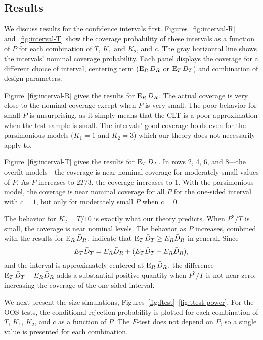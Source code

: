 \documentclass[11pt]{article}
\begin{document}
\subsection{Results}
We discuss results for the confidence intervals first.
Figures~\ref{fig:interval-R} and~\ref{fig:interval-T} show the
coverage probability of these intervals as a function of $P$ for each
combination of $T$, $K_1$ and $K_2$, and $c$.  The gray horizontal
line shows the intervals' nominal coverage probability.  Each panel
displays the coverage for a different choice of interval, centering
term ($\operatorname{E}_R \bar{D}_{R}$ or $\operatorname{E}_T \bar{D}_{T}$) and combination of design
parameters.

Figure~\ref{fig:interval-R} gives the results for $\operatorname{E}_R \bar{D}_{R}$.  The
actual coverage is very close to the nominal coverage except when $P$
is very small.  The poor behavior for small $P$ is unsurprising, as it
simply means that the CLT is a poor approximation when the test
sample is small.  The intervals' good coverage holds even for the
parsimonious models ($K_1=1$ and $K_2= 3$) which our theory does not
necessarily apply to.

Figure~\ref{fig:interval-T} gives the results for $\operatorname{E}_T \bar{D}_{T}$.  In
rows 2, 4, 6, and 8---the overfit models---the coverage is near
nominal coverage for moderately small values of $P$.  As $P$ increases
to $2T/3$, the coverage increases to 1.  With the parsimonious model,
the coverage is near nominal coverage for all $P$ for the one-sided
interval with $c=1$, but only for moderately small $P$ when $c=0$.

The behavior for $K_2 = T/10$ is exactly what our theory predicts.
When $P^2/T$ is small, the coverage is near nominal levels.  The
behavior as $P$ increases, combined with the results for $\operatorname{E}_R
\bar{D}_{R}$, indicate that $\operatorname{E}_T \bar{D}_{T} \geq E_R \bar{D}_{R}$ in general.
Since
\[E_{T} \bar{D}_{T} = E_{R} \bar{D}_{R} + (E_{T} \bar{D}_{T} - E_{R} \bar{D}_{R}), \] and the
interval is approximately centered at $\operatorname{E}_R \bar{D}_{R}$, the difference
$\operatorname{E}_{T} \bar{D}_{T} - E_{R} \bar{D}_{R}$ adds a substantial positive quantity when
$P^2/T$ is not near zero, increasing the coverage of the one-sided
interval.

We next present the size simulations,
Figures~\ref{fig:ftest}--\ref{fig:ttest-power}.  For the OOS tests,
the conditional rejection probability is plotted for each combination
of $T$, $K_1$, $K_2$, and $c$ as a function of $P$.  The $F$-test does
not depend on $P$, so a single value is presented for each
combination.
\end{document}
